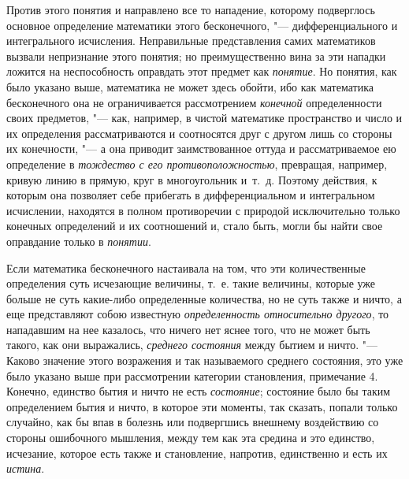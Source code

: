 Против этого понятия и направлено все то нападение, которому подверглось
основное определение математики этого бесконечного, "--- дифференциального и
интегрального исчисления. Неправильные представления самих математиков
вызвали непризнание этого понятия; но преимущественно вина за эти нападки
ложится на неспособность оправдать этот предмет как
{\em понятие}. Но понятия, как было указано выше,
математика не может здесь обойти, ибо как математика бесконечного она не
ограничивается рассмотрением {\em конечной}
определенности своих предметов, "--- как, например, в чистой математике
пространство и число и их определения рассматриваются и соотносятся друг с
другом лишь со стороны их конечности, "--- а она приводит заимствованное
оттуда и рассматриваемое ею определение в
{\em тождество с его противоположностью}, превращая,
например, кривую линию в прямую, круг в многоугольник и~т.~д. Поэтому
действия, к которым она позволяет себе прибегать в дифференциальном и
интегральном исчислении, находятся в полном противоречии с природой
исключительно только конечных определений и их соотношений и, стало быть,
могли бы найти свое оправдание только в {\em понятии}.

Если математика бесконечного настаивала на том, что эти количественные
определения суть исчезающие величины, т.~е. такие величины, которые уже
больше не суть какие-либо определенные количества, но не суть также и
ничто, а еще представляют собою известную
{\em определенность относительно другого}, то
нападавшим на нее казалось, что ничего нет яснее того, что не может быть
такого, как они выражались, {\em среднего состояния}
между бытием и ничто. "--- Каково значение этого возражения и так называемого
среднего состояния, это уже было указано выше при рассмотрении категории
становления, примечание 4. Конечно, единство бытия и ничто не есть
{\em состояние}; состояние было бы таким определением
бытия и ничто, в которое эти моменты, так сказать, попали только случайно,
как бы впав в болезнь или подвергшись внешнему воздействию со стороны
ошибочного мышления, между тем как эта средина и это единство, исчезание,
которое есть также и становление, напротив, единственно и есть их
{\em истина}.

